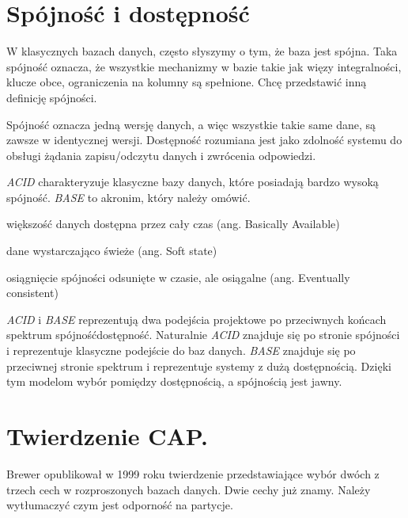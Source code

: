 \documentclass[oneside, 11pt, a4paper]{article}
\begin{document}
\begin{multicols}{2}
\section{Spójność i dostępność}
W klasycznych bazach danych, często słyszymy o tym, że baza jest spójna. Taka spójność oznacza, że wszystkie mechanizmy w bazie takie jak więzy integralności, klucze obce, ograniczenia na kolumny są spełnione. Chcę przedstawić inną definicję spójności.

Spójność oznacza jedną wersję danych, a więc wszystkie takie same dane, są zawsze w identycznej wersji. Dostępność rozumiana jest jako zdolność systemu do obsługi żądania zapisu/odczytu danych i zwrócenia odpowiedzi. 

\emph{ACID} charakteryzuje klasyczne bazy danych, które posiadają bardzo wysoką spójność. \emph{BASE} to akronim, który należy omówić. 

\begin{compactitem}
  \item większość danych dostępna przez cały czas (ang. Basically Available)
  \item dane wystarczająco świeże (ang. Soft state)
  \item osiągnięcie spójności odsunięte w czasie, ale osiągalne (ang. Eventually consistent)
\end{compactitem}

\emph{ACID} i \emph{BASE} reprezentują dwa podejścia projektowe po przeciwnych końcach spektrum spójność\dywiz dostępność. Naturalnie \emph{ACID} znajduje się po stronie spójności i reprezentuje klasyczne podejście do baz danych. \emph{BASE} znajduje się po przeciwnej stronie spektrum i reprezentuje systemy z dużą dostępnością. Dzięki tym modelom wybór pomiędzy dostępnością, a spójnością jest jawny.


\section{Twierdzenie CAP.}
Brewer opublikował w 1999 roku \cite{Fox99harvest} twierdzenie przedstawiające wybór dwóch z trzech cech w rozproszonych bazach danych. Dwie cechy już znamy. Należy wytłumaczyć czym jest odporność na partycje. 


\end{multicols}
\end{document}
